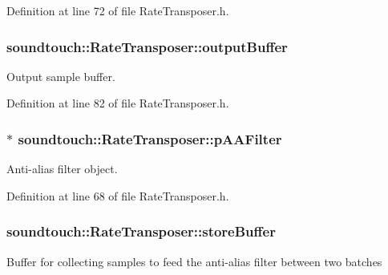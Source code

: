 Definition at line 72 of file Rate\+Transposer.\+h.

\subsubsection[{\texorpdfstring{output\+Buffer}{outputBuffer}}]{ soundtouch\+::\+Rate\+Transposer\+::output\+Buffer\hspace{0.3cm}{\ttfamily [protected]}}\hypertarget{classsoundtouch_1_1_rate_transposer_a13e97123dd8921c3ac036893aac2df30}{}\label{classsoundtouch_1_1_rate_transposer_a13e97123dd8921c3ac036893aac2df30}


Output sample buffer. 



Definition at line 82 of file Rate\+Transposer.\+h.

\subsubsection[{\texorpdfstring{p\+A\+A\+Filter}{pAAFilter}}]{$\ast$ soundtouch\+::\+Rate\+Transposer\+::p\+A\+A\+Filter\hspace{0.3cm}{\ttfamily [protected]}}\hypertarget{classsoundtouch_1_1_rate_transposer_ac32a7256b536fbc54d326642265f746b}{}\label{classsoundtouch_1_1_rate_transposer_ac32a7256b536fbc54d326642265f746b}


Anti-\/alias filter object. 



Definition at line 68 of file Rate\+Transposer.\+h.

\subsubsection[{\texorpdfstring{store\+Buffer}{storeBuffer}}]{ soundtouch\+::\+Rate\+Transposer\+::store\+Buffer\hspace{0.3cm}{\ttfamily [protected]}}\hypertarget{classsoundtouch_1_1_rate_transposer_aeff1b8c025f1c3397cad4d59648997cc}{}\label{classsoundtouch_1_1_rate_transposer_aeff1b8c025f1c3397cad4d59648997cc}
Buffer for collecting samples to feed the anti-\/alias filter between two batches 

